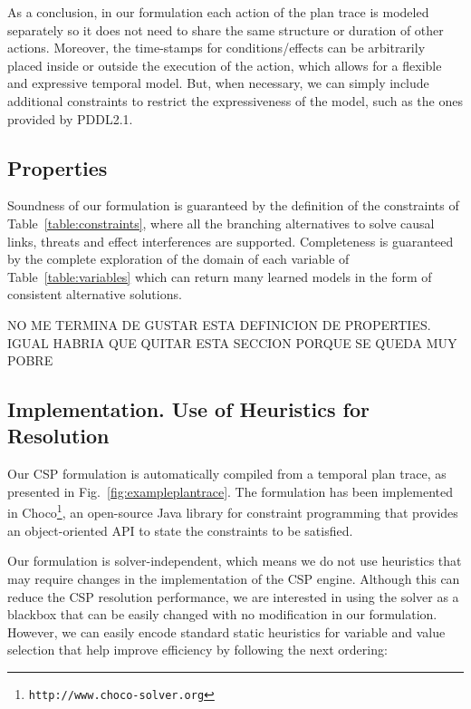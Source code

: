 \documentclass[runningheads]{llncs}
\begin{document}
As a conclusion, in our formulation each action of the plan trace is modeled separately so it does not need to share the same structure or duration of other actions. Moreover, the time-stamps for conditions/effects can be arbitrarily placed inside or outside the execution of the action, which allows for a flexible and expressive temporal model. But, when necessary, we can simply include additional constraints to restrict the expressiveness of the model, such as the ones provided by PDDL2.1.



\subsection{Properties}

Soundness of our formulation is guaranteed by the definition of the constraints of Table~\ref{table:constraints}, where all the branching alternatives to solve causal links, threats and effect interferences are supported. Completeness is guaranteed by the complete exploration of the domain of each variable of Table~\ref{table:variables} which can return many learned models in the form of consistent alternative solutions.


NO ME TERMINA DE GUSTAR ESTA DEFINICION DE PROPERTIES. IGUAL HABRIA QUE QUITAR ESTA SECCION PORQUE SE QUEDA MUY POBRE








\subsection{Implementation. Use of Heuristics for Resolution}
\label{sec:implementation}

Our CSP formulation is automatically compiled from a temporal plan trace, as presented in Fig.~\ref{fig:exampleplantrace}. The formulation has been implemented in \textsf{Choco}\footnote{\texttt{http://www.choco-solver.org}}, an open-source Java library for constraint programming that provides an object-oriented API to state the constraints to be satisfied.

Our formulation is solver-independent, which means we do not use heuristics that may require changes in the implementation of the CSP engine.
Although this can reduce the CSP resolution performance, we are interested in using the solver as a blackbox that can be easily changed with no modification in our formulation. However, we can easily encode standard static heuristics for variable and value selection that help improve efficiency by following the next ordering:
\end{document}

